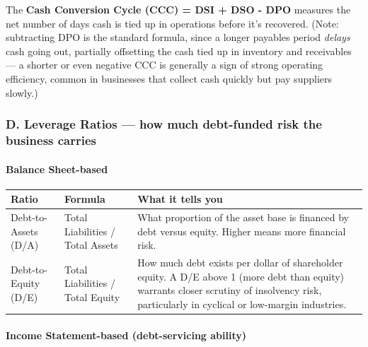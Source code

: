 \documentclass[12pt,openany]{book}
\begin{document}
The \textbf{Cash Conversion Cycle (CCC) = DSI + DSO - DPO} measures the net number of days cash is tied up in operations before it's recovered. (Note: subtracting DPO is the standard formula, since a longer payables period \emph{delays} cash going out, partially offsetting the cash tied up in inventory and receivables --- a shorter or even negative CCC is generally a sign of strong operating efficiency, common in businesses that collect cash quickly but pay suppliers slowly.)

\subsubsection{D. Leverage Ratios --- how much debt-funded risk the business carries}

\paragraph{Balance Sheet-based} 

\begingroup
\small
\setlength{\tabcolsep}{4pt}
\begin{center}\begin{tabular}{|L{0.22\textwidth}|L{0.24\textwidth}|L{0.42\textwidth}|}
\hline
\textbf{Ratio} & \textbf{Formula} & \textbf{What it tells you} \\
\hline
Debt-to-Assets (D/A) & Total Liabilities / Total Assets & What proportion of the asset base is financed by debt versus equity. Higher means more financial risk. \\
\hline
Debt-to-Equity (D/E) & Total Liabilities / Total Equity & How much debt exists per dollar of shareholder equity. A D/E above 1 (more debt than equity) warrants closer scrutiny of insolvency risk, particularly in cyclical or low-margin industries. \\
\hline
\end{tabular}\end{center}
\endgroup

\paragraph{Income Statement-based (debt-servicing ability)} 
\end{document}
